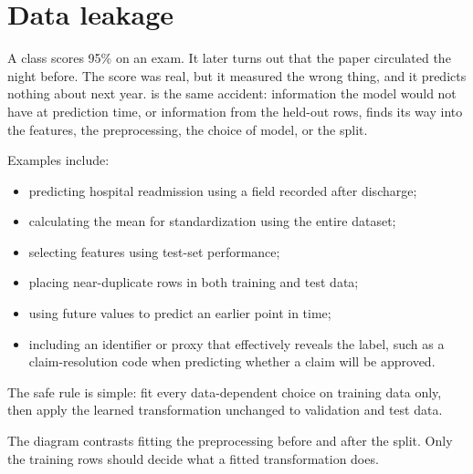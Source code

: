 \section{Data leakage}
\label{sec:data-leakage}

\begin{analogy}
A class scores 95\% on an exam. It later turns out that the paper circulated the night before. The score was real, but it measured the wrong thing, and it predicts nothing about next year.  is the same accident: information the model would not have at prediction time, or information from the held-out rows, finds its way into the features, the preprocessing, the choice of model, or the split.
\end{analogy}

Examples include:

\begin{itemize}
  \item predicting hospital readmission using a field recorded after discharge;
  \item calculating the mean for standardization using the entire dataset;
  \item selecting features using test-set performance;
  \item placing near-duplicate rows in both training and test data;
  \item using future values to predict an earlier point in time;
  \item including an identifier or proxy that effectively reveals the label, such as a claim-resolution code when predicting whether a claim will be approved.
\end{itemize}

The safe rule is simple: fit every data-dependent choice on training data only, then apply the learned transformation unchanged to validation and test data.

The diagram contrasts fitting the preprocessing before and after the split. Only the training rows should decide what a fitted transformation does.

